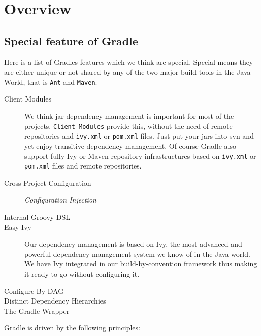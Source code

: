 \chapter{Overview} %
\label{cha:overview}

\section{Special feature of Gradle} %
\label{sec:special_feature_of_gradle}
Here is a list of Gradles features which we think are special. Special means they are either unique or not shared by any of the two major build tools in the Java World, that is \texttt{Ant} and \texttt{Maven}.
\begin{description}
	\item[Client Modules] We think jar dependency management is important for most of the projects. \texttt{Client Modules} provide this, without the need of remote repositories and \texttt{ivy.xml} or \texttt{pom.xml} files. Just put your jars into svn and yet enjoy transitive dependency management. Of course Gradle also support fully Ivy or Maven repository infrastructures based on \texttt{ivy.xml} or \texttt{pom.xml} files and remote repositories.
	\item[Cross Project Configuration] \emph{Configuration Injection}
	\item[Internal Groovy DSL] 
	\item[Easy Ivy] Our dependency management is based on Ivy, the most advanced and powerful dependency management system we know of in the Java world. We have Ivy integrated in our build-by-convention framework thus making it ready to go without configuring it.
	\item[Configure By DAG] 
	\item[Distinct Dependency Hierarchies]
    \item[The Gradle Wrapper]  
\end{description}

Gradle is driven by the following principles:

